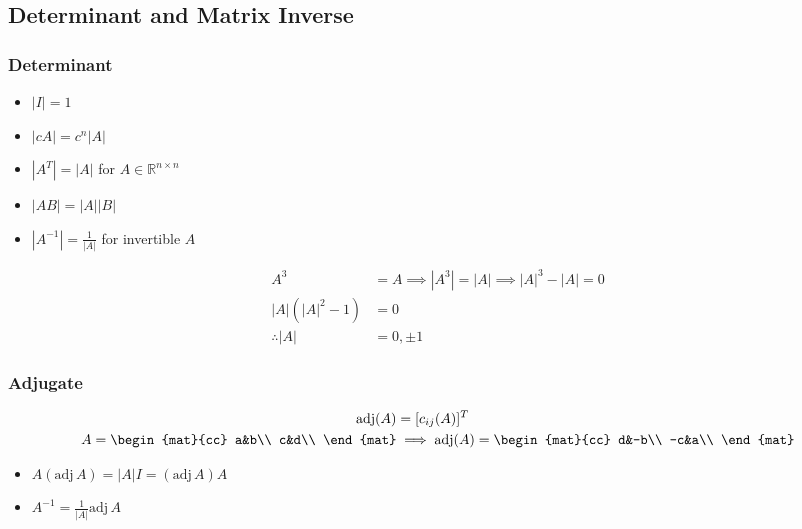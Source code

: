 	\subsection{Determinant and Matrix Inverse}
	    \subsubsection{Determinant}
		    \begin{theorem}
				\begin{itemize}
					\item $|I|=1$
				    \item $|cA|=c^n|A|$
				    \item $|A^T|=|A|$ for $A\in\mathbb{R}^{n\times n}$
				    \item $|AB|=|A||B|$
				    \item $|A^{-1}|=\frac1{|A|}$ for invertible $A$
				\end{itemize}
		    \end{theorem}
			\begin{example}[find $|A|$ if $A^3=A$]
				\begin{align*}
					A^3&=A\implies|A^3|=|A|\implies|A|^3-|A|=0\\
					|A|(|A|^2-1)&=0\\
					\therefore |A|&=0,\pm1
				\end{align*}
			\end{example}
		\subsubsection{Adjugate}
		    \begin{definition}
				\begin{align*}
					\mathrm{adj}(A)&=[c_{ij}(A)]^T\\
					A=\begin{mat}{cc} a&b\\ c&d\\ \end{mat}&\implies\mathrm{adj}(A)=\begin{mat}{cc} d&-b\\ -c&a\\ \end{mat}
				\end{align*}
		    \end{definition}
			\begin{theorem}
				\begin{itemize}
					\item $A(\mathrm{adj}\,A)=|A|I=(\mathrm{adj}\,A)A$
					\item $A^{-1}=\frac1{|A|}\mathrm{adj}\,A$
				\end{itemize}
			\end{theorem}
